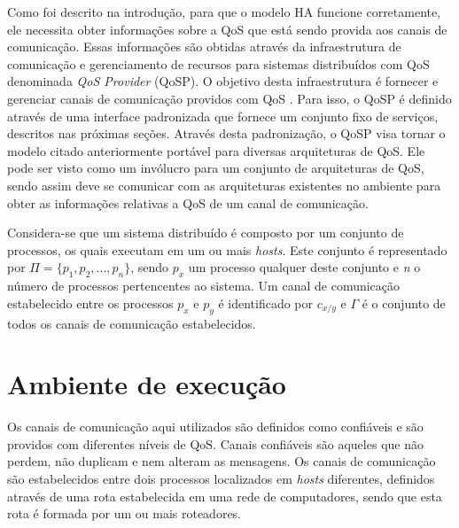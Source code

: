 \label{cap:qos_provider}
\acresetall

	Como foi descrito na introdução, para que o modelo HA funcione corretamente, ele necessita obter informações sobre a QoS que está sendo provida aos canais de comunicação. Essas informações são obtidas através da infraestrutura de comunicação e gerenciamento de recursos para sistemas distribuídos com QoS denominada \textit{QoS Provider} (QoSP). O objetivo desta infraestrutura é fornecer e gerenciar canais de comunicação providos com QoS \cite{GORENDER05}. Para isso, o QoSP é definido através de uma interface padronizada que fornece um conjunto fixo de serviços, descritos nas próximas seções. Através desta padronização, o QoSP visa tornar o modelo citado anteriormente portável para diversas arquiteturas de QoS. Ele pode ser visto como um invólucro para um conjunto de arquiteturas de QoS, sendo assim deve se comunicar com as arquiteturas existentes no ambiente para obter as informações relativas a QoS de um canal de comunicação.
	
	Considera-se que um sistema distribuído é composto por um conjunto de processos, os quais executam em um ou mais \textit{hosts}. Este conjunto é representado por $\Pi = \lbrace p_{1}, p_{2}, ..., p_{n} \rbrace$, sendo $p_{x}$ um processo qualquer deste conjunto e \textit{n} o número de processos pertencentes ao sistema. Um canal de comunicação estabelecido entre os processos $p_{x}$ e $p_{y}$ é identificado por $c_{x/y}$ e $\Gamma$ é o conjunto de todos os canais de comunicação estabelecidos.

\section{Ambiente de execução} %

	Os canais de comunicação aqui utilizados são definidos como confiáveis e são providos com diferentes níveis de QoS. Canais confiáveis são aqueles que não perdem, não duplicam e nem alteram as mensagens. Os canais de comunicação são estabelecidos entre dois processos localizados em \textit{hosts} diferentes, definidos através de uma rota estabelecida em uma rede de computadores, sendo que esta rota é formada por um ou mais roteadores.
	
